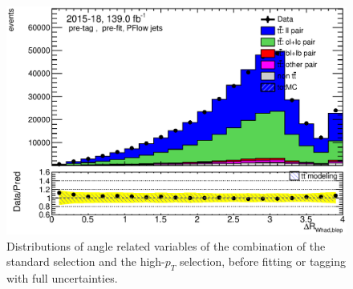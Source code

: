 \documentclass[letterpaper,12pt]{article}
\begin{document}
\begin{figure}[H]
\begin{minipage}[b]{.45\textwidth}
	\includegraphics[width=1\textwidth]{Oct_distributions/pretagNoRwDL1rwithhighpTPFlow_scaledall/DataMC_dRWhadblep.eps} 
	\end{minipage}
	\caption{Distributions of angle related variables of the combination of the standard 
	selection and the high-$p_T$ selection, before fitting or 
	tagging with full uncertainties.} \label{fig:angles_PFlow}
	\end{figure}
	
\end{document}
